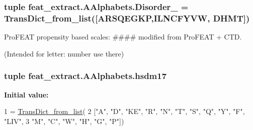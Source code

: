 \subsubsection[{Disorder\+\_\+3}]{\setlength{\rightskip}{0pt plus 5cm}tuple feat\+\_\+extract.\+A\+Alphabets.\+Disorder\+\_ = {\bf Trans\+Dict\+\_\+from\+\_\+list}(\mbox{[}\textquotesingle{}A\+R\+S\+Q\+E\+G\+K\+P\textquotesingle{},\textquotesingle{}I\+L\+N\+C\+F\+Y\+V\+W\textquotesingle{}, \textquotesingle{}D\+H\+M\+T\textquotesingle{}\mbox{]})}\label{namespacefeat__extract_1_1_a_alphabets_aa82e15fb161a0799d632bdadd04c5b99}


Pro\+F\+E\+A\+T propensity based scales\+: \#\#\#\# modified from Pro\+F\+E\+A\+T + C\+T\+D. 

(Intended for letter\+: number use there) \hypertarget{namespacefeat__extract_1_1_a_alphabets_a7b99cba2aaced95bead28b5a13465bb0}{}
\subsubsection[{hsdm17}]{\setlength{\rightskip}{0pt plus 5cm}tuple feat\+\_\+extract.\+A\+Alphabets.\+hsdm17}\label{namespacefeat__extract_1_1_a_alphabets_a7b99cba2aaced95bead28b5a13465bb0}
{\bfseries Initial value\+:}
\begin{DoxyCode}
1 = \hyperlink{namespacefeat__extract_1_1_a_alphabets_acdda8523b57175e0e79064c4da723c5d}{TransDict\_from\_list}(
2   [\textcolor{stringliteral}{"A"}, \textcolor{stringliteral}{"D"}, \textcolor{stringliteral}{"KE"}, \textcolor{stringliteral}{"}\textcolor{stringliteral}{R", "}N", "T", "S", "Q", "Y", "F", "LIV",
3   \textcolor{stringliteral}{"M"}, \textcolor{stringliteral}{"C"}, \textcolor{stringliteral}{"W"}, \textcolor{stringliteral}{"H"}, \textcolor{stringliteral}{"G"}, \textcolor{stringliteral}{"P"}])
\end{DoxyCode}
\hypertarget{namespacefeat__extract_1_1_a_alphabets_afc9c9f0083238e1c856dc8b7b0038cb4}{}
